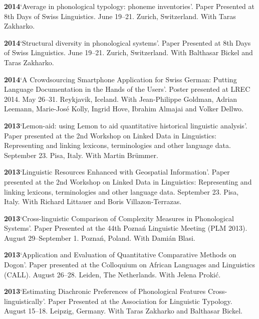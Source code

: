 \documentclass[11pt]{article}
\newcommand{\hangpara}{
 \setlength{\parindent}{0in} %
 \hangindent=0.42in %
}
\begin{document}
\vskip 6pt
\hangpara
{\bf 2014}\hspace{1ex}`Average in phonological typology: phoneme inventories'. Paper Presented at 8th Days of Swiss Linguistics. June 19--21. Zurich, Switzerland. With Taras Zakharko.

\vskip 6pt
\hangpara
{\bf 2014}\hspace{1ex}`Structural diversity in phonological systems'. Paper Presented at 8th Days of Swiss Linguistics. June 19--21. Zurich, Switzerland. With Balthasar Bickel and Taras Zakharko.

\vskip 6pt
\hangpara
{\bf 2014}\hspace{1ex}`A Crowdsourcing Smartphone Application for Swiss German: Putting Language Documentation in the Hands of the Users'. Poster presented at LREC 2014. May 26--31. Reykjavik, Iceland. With Jean-Philippe Goldman, Adrian Leemann, Marie-Jos{\'e} Kolly, Ingrid Hove, Ibrahim Almajai and Volker Dellwo.

\vskip 6pt
\hangpara
{\bf 2013}\hspace{1ex}`Lemon-aid: using Lemon to aid quantitative historical linguistic analysis'. Paper presented at the 2nd Workshop on Linked Data in Linguistics: Representing and linking lexicons, terminologies and other language data. September 23. Pisa, Italy. With Martin Brümmer. 

\vskip 6pt
\hangpara
{\bf 2013}\hspace{1ex}`Linguistic Resources Enhanced with Geospatial Information'. Paper presented at the 2nd Workshop on Linked Data in Linguistics: Representing and linking lexicons, terminologies and other language data. September 23. Pisa, Italy. With Richard Littauer and Boris Villazon-Terrazas.

\vskip 6pt
\hangpara
{\bf 2013}\hspace{1ex}`Cross-linguistic Comparison of Complexity Measures in Phonological Systems'. Paper Presented at the 44th Pozna{\'n} Linguistic Meeting (PLM 2013). August 29--September 1. Pozna{\'n}, Poland. With Dami{\'a}n Blasi.

\vskip 6pt
\hangpara
{\bf 2013}\hspace{1ex}`Application and Evaluation of Quantitative Comparative Methods on Dogon'. Paper presented at the Colloquium on African Languages and Linguistics (CALL). August 26--28. Leiden, The Netherlands. With Jelena Proki{\'c}.

\vskip 6pt
\hangpara
{\bf 2013}\hspace{1ex}`Estimating Diachronic Preferences of Phonological Features Cross-linguistically'. Paper Presented at the Association for Linguistic Typology. August 15--18. Leipzig, Germany. With Taras Zakharko and Balthasar Bickel.
\end{document}
